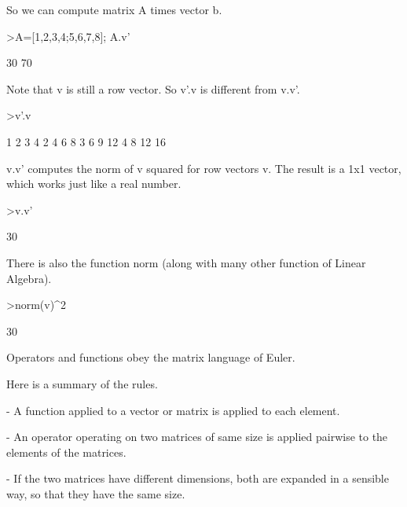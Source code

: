 \documentclass{article}
\begin{document}
\begin{eulernotebook}
\begin{eulercomment}
\begin{eulercomment}
\begin{eulercomment}
\begin{eulercomment}
\begin{eulercomment}
\begin{eulercomment}
\begin{eulercomment}
So we can compute matrix A times vector b.
\end{eulercomment}
\begin{eulerprompt}
>A=[1,2,3,4;5,6,7,8]; A.v'
\end{eulerprompt}
\begin{euleroutput}
             30 
             70 
\end{euleroutput}
\begin{eulercomment}
Note that v is still a row vector. So v'.v is different from v.v'.
\end{eulercomment}
\begin{eulerprompt}
>v'.v
\end{eulerprompt}
\begin{euleroutput}
              1             2             3             4 
              2             4             6             8 
              3             6             9            12 
              4             8            12            16 
\end{euleroutput}
\begin{eulercomment}
v.v' computes the norm of v squared for row vectors v. The result is a
1x1 vector, which works just like a real number.
\end{eulercomment}
\begin{eulerprompt}
>v.v'
\end{eulerprompt}
\begin{euleroutput}
  30
\end{euleroutput}
\begin{eulercomment}
There is also the function norm (along with many other function of
Linear Algebra).
\end{eulercomment}
\begin{eulerprompt}
>norm(v)^2
\end{eulerprompt}
\begin{euleroutput}
  30
\end{euleroutput}
\begin{eulercomment}
Operators and functions obey the matrix language of Euler.

Here is a summary of the rules.

- A function applied to a vector or matrix is applied to each element.

- An operator operating on two matrices of same size is applied pairwise to
the elements of the matrices.

- If the two matrices have different dimensions, both are expanded in a
sensible way, so that they have the same size.


\end{eulercomment}
\end{eulercomment}
\end{eulercomment}
\end{eulercomment}
\end{eulercomment}
\end{eulercomment}
\end{eulercomment}
\end{eulernotebook}
\end{document}
